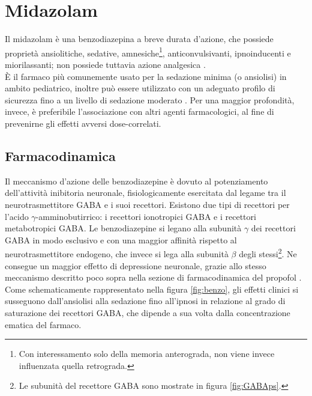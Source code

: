 \section{Midazolam}

Il midazolam è una benzodiazepina a breve durata d'azione, che possiede proprietà ansiolitiche, sedative, amnesiche\footnote{Con interessamento solo della memoria anterograda, non viene invece influenzata quella retrograda.}, anticonvulsivanti, ipnoinducenti e miorilassanti; non possiede tuttavia azione analgesica \cite{Krauss2006}. 
\\ \`E il farmaco più comunemente usato per la sedazione minima (o ansiolisi) in ambito pediatrico, inoltre può essere utilizzato con un adeguato profilo di sicurezza fino a un livello di sedazione moderato \cite{Manso2019}. Per una maggior profondità, invece, è preferibile l'associazione con altri agenti farmacologici, al fine di prevenirne gli effetti avversi dose-correlati.

\subsection*{Farmacodinamica}

Il meccanismo d'azione delle benzodiazepine è dovuto al potenziamento dell'attività inibitoria neuronale, fisiologicamente esercitata dal legame tra il neurotrasmettitore GABA e i suoi recettori. Esistono due tipi di recettori per l'acido $\gamma$-amminobutirrico: i recettori ionotropici GABA e i recettori metabotropici GABA. Le benzodiazepine si legano alla subunità $\gamma$ dei recettori GABA in modo esclusivo e con una maggior affinità rispetto al neurotrasmettitore endogeno, che invece si lega alla subunità $\beta$ degli stessi\footnote{Le subunità del recettore GABA sono mostrate in figura \ref{fig:GABAps}.}. Ne consegue un maggior effetto di depressione neuronale, grazie allo stesso meccanismo descritto poco sopra nella sezione di farmacodinamica del propofol \cite{Olkkola2008}. 
\\Come schematicamente rappresentato nella figura \ref{fig:benzo}, gli effetti clinici si susseguono dall'ansiolisi alla sedazione fino all'ipnosi in relazione al grado di saturazione dei recettori GABA, che dipende a sua volta dalla concentrazione ematica del farmaco. 

